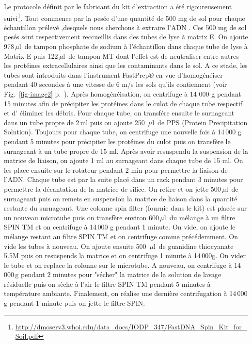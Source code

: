 \documentclass[a4paper,11pt]{article}
\begin{document}
Le protocole définit par le fabricant du kit d'extraction a été
rigoureusement
suivi\footnote{\url{http://dmoserv3.whoi.edu/data_docs/IODP_347/FastDNA_Spin_Kit_for_Soil.pdf}}.
Tout commence par la pesée d'une quantité de 500 mg de sol pour chaque
échantillon prélevé ,desquels nous cherchons à extraire l'ADN . Ces
500 mg de sol pesés sont respectivement reccueillis dans des tubes de
lyse à matrix E.  On ajoute 978\,$\mu$l\, de tampon phosphate de
sodium à l'échantillon dans chaque tube de lyse à Matrix E puis
122\,$\mu$l\, de tampon MT dont l'effet est de neutraliser entre
autres les protéines extracellulaires ainsi que les contaminants dans
le sol.  A ce stade, les tubes sont introduits dans l'instrument
FastPrep® en vue d'homogénéiser pendant 40 secondes à une vitesse de 6
m/s les sols qu'ils contiennent (voir Fig.~\ref{fig-image2}
p.~\pageref{fig-image2}).  Après homogénéisation, on centrifuge à 14
000 g pendant 15 minutes afin de précipiter les protéines dans le
culot de chaque tube respectif et d' éliminer les débris.  Pour chaque
tube, on transfére ensuite le surnageant dans un tube propre de 2\,ml
puis on ajoute 250 \,$\mu$l\, de PPS (Protein Precipitation
Solution). Toujours pour chaque tube, on centrifuge une nouvelle fois
à 14\,000 g pendant 5 minutes pour précipiter les protéines du culot
puis on transfère le surnageant à un tube propre de 15 ml.  Après
avoir resuspendu la suspension de la matrice de liaison, on ajoute 1
ml au surnageant dans chaque tube de 15 ml. On les place ensuite sur
le rotateur pendant 2 min pour permettre la liaison de l'ADN. Chaque
tube est par la suite placé dans un rack pendant 3 minutes pour
permettre la décantation de la matrice de silice.  On retire et on
jette 500\,$\mu$l\, de surnageant puis on remets en suspension la
matrice de liaison dans la quantité restante du surnageant. Une
colonne spin filter (fournie dans le kit) est placée sur un nouveau
microtube puis on transfère environ 600\,$\mu$l\, du mélange à un
filtre SPIN TM et on centrifuge à 14\,000 g pendant 1 minute. On vide,
on ajoute le mélange restant au filtre SPIN TM et on centrifuge comme
précédemment. On vide les tubes à nouveau.  On ajoute ensuite 500
\,$\mu$l\, de guanidine thiocyanate 5.5M puis on resuspends la matrice
et on centrifuge 1 minute à 14\,000g. On vider le tube et on replace
la colonne sur le microtube.  A nouveau, on centrifuge à 14 000\,g
pendant 2 minutes pour "sécher" la matrice de la solution de lavage
résiduelle puis on sèche à l'air le filtre SPIN TM pendant 5 minutes à
température ambiante. Finalement, on réalise une dernière
centrifugation à 14\,000 g pendant 1 minute puis on jette le filtre
SPIN.
\end{document}
